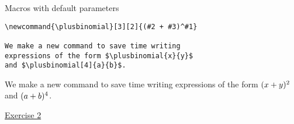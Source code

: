 \begin{frame}[fragile]{Macros with default parameters}
\begin{lstlisting}
\newcommand{\plusbinomial}[3][2]{(#2 + #3)^#1}

We make a new command to save time writing
expressions of the form $\plusbinomial{x}{y}$
and $\plusbinomial[4]{a}{b}$.

\end{lstlisting}
We make a new command to save time writing expressions of the form
$\plusbinomial{x}{y}$ and $\plusbinomial[4]{a}{b}$.
\end{frame}

\begin{frame}[standout]
\href{https://jwalton.info/assets/teaching/latex/exercise_2.pdf}%
{\color{white}Exercise 2}
\end{frame}

